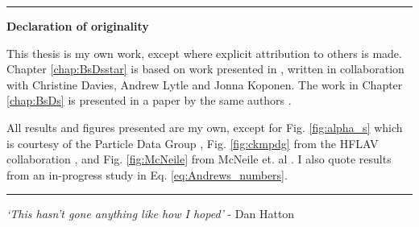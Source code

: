 \begin{titlepage}
\begin{vcenterpage}
\noindent\rule[2pt]{\textwidth}{0.5pt}
\begin{center}
{\large\textbf{Declaration of originality}}
\end{center}
This thesis is my own work, except where explicit attribution to others is made. Chapter \ref{chap:BsDsstar} is based on work presented in \cite{McLean:2019sds}, written in collaboration with Christine Davies, Andrew Lytle and Jonna Koponen. The work in Chapter \ref{chap:BsDs} is presented in a paper by the same authors \cite{McLean:2019qcx}.

All results and figures presented are my own, except for Fig. \ref{fig:alpha_s} which is courtesy of the Particle Data Group \cite{PhysRevD.98.030001}, Fig. \ref{fig:ckmpdg} from the HFLAV collaboration \cite{HFLAV16}, and Fig. \ref{fig:McNeile} from McNeile et. al \cite{McNeile:2012qf}. I also quote results from an in-progress study \cite{Colquhoun:2016osw} in Eq. \eqref{eq:Andrews_numbers}.
    
\noindent\rule[2pt]{\textwidth}{0.5pt}
\end{vcenterpage}

\cleardoublepage

\thispagestyle{empty}

\begin{center}
  \emph{`This hasn't gone anything like how I hoped'} - Dan Hatton
\end{center}


\end{titlepage}
\sloppy

\titlepage
